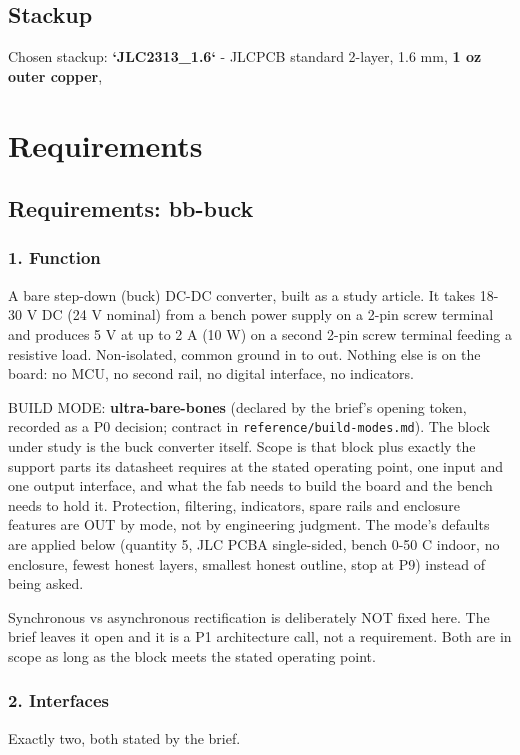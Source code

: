 \documentclass[11pt,a4paper]{article}
\begin{document}
\subsection*{Stackup}
Chosen stackup: \textbf{`JLC2313\_1.6`} - JLCPCB standard 2-layer, 1.6 mm, \textbf{1 oz outer copper},
\section{Requirements}
\subsection*{Requirements: bb-buck}
\subsubsection*{1. Function}
A bare step-down (buck) DC-DC converter, built as a study article. It takes 18-30 V DC (24 V nominal) from a bench power supply on a 2-pin screw terminal and produces 5 V at up to 2 A (10 W) on a second 2-pin screw terminal feeding a resistive load. Non-isolated, common ground in to out. Nothing else is on the board: no MCU, no second rail, no digital interface, no indicators.

BUILD MODE: \textbf{ultra-bare-bones} (declared by the brief's opening token, recorded as a P0 decision; contract in \texttt{reference/build-modes.md}). The block under study is the buck converter itself. Scope is that block plus exactly the support parts its datasheet requires at the stated operating point, one input and one output interface, and what the fab needs to build the board and the bench needs to hold it. Protection, filtering, indicators, spare rails and enclosure features are OUT by mode, not by engineering judgment. The mode's defaults are applied below (quantity 5, JLC PCBA single-sided, bench 0-50 C indoor, no enclosure, fewest honest layers, smallest honest outline, stop at P9) instead of being asked.

Synchronous vs asynchronous rectification is deliberately NOT fixed here. The brief leaves it open and it is a P1 architecture call, not a requirement. Both are in scope as long as the block meets the stated operating point.

\subsubsection*{2. Interfaces}
Exactly two, both stated by the brief.
\end{document}

